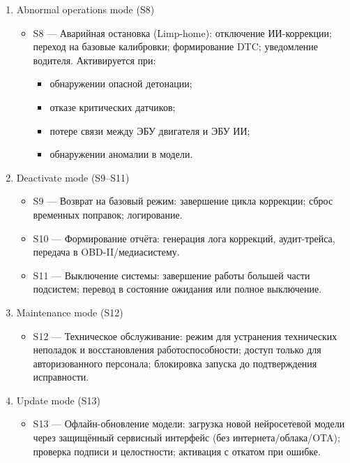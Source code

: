 \documentclass[14pt, a4paper]{extarticle}
\begin{document}
\begin{enumerate}
						\item Abnormal operations mode (S8)
							\begin{itemize}
								\item S8 — Аварийная остановка (Limp-home): отключение ИИ-коррекции; переход на базовые калибровки; формирование DTC; уведомление водителя. Активируется при:
									\begin{itemize}
										\item обнаружении опасной детонации;
										\item отказе критических датчиков;
										\item потере связи между ЭБУ двигателя и ЭБУ ИИ;
										\item обнаружении аномалии в модели.
									\end{itemize}
							\end{itemize}
						
						\item Deactivate mode (S9–S11)
							\begin{itemize}
								\item S9 — Возврат на базовый режим: завершение цикла коррекции; сброс временных поправок; логирование.
								\item S10 — Формирование отчёта: генерация лога коррекций, аудит-трейса, передача в OBD-II/медиасистему.
								\item S11 — Выключение системы: завершение работы большей части подсистем; перевод в состояние ожидания или полное выключение.
							\end{itemize}
						
						\item Maintenance mode (S12)
							\begin{itemize}
								\item S12 — Техническое обслуживание: режим для устранения технических неполадок и восстановления работоспособности; доступ только для авторизованного персонала; блокировка запуска до подтверждения исправности.
							\end{itemize}
						
						\item Update mode (S13)
							\begin{itemize}
								\item S13 — Офлайн-обновление модели: загрузка новой нейросетевой модели через защищённый сервисный интерфейс (без интернета/облака/OTA); проверка подписи и целостности; активация с откатом при ошибке.
							\end{itemize}
					\end{enumerate}
			
\end{document}
